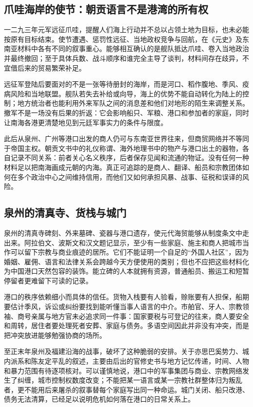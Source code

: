 \subsection{爪哇海岸的使节：朝贡语言不是港湾的所有权}

一二九三年元军远征爪哇，提醒人们海上行动并不总以占领土地为目标，也未必能按原有目标结束。使节遭遇、惩罚性远征、当地政权竞争与回航，在《元史》及东南亚材料中各有不同的叙事重心。能够相互确认的是舰队抵达爪哇、卷入当地政治并最终撤回；至于具体兵数、战斗顺序和谁完全主导了谈判，材料间存在歧异，不宜借后来的贸易繁荣补足。

远征军登陆后要面对的不是一张等待册封的海岸，而是河口、稻作腹地、季风、疫病风险和当地联盟。舰队若失去补给或向导，海上的优势不能自动转化为陆上的控制；地方统治者也能利用外来军队之间的消息差和他们对地形的陌生来调整关系。撤军不是一场没有后果的折返：它会影响船只、军粮、港口和参加者的家庭，同时让南海各港更清楚地见到元廷军事实力的条件与限度。

此后从泉州、广州等港口出发的商人仍可与东南亚世界往来，但商贸网络并不等同于帝国主权。朝贡文书中的礼仪称谓、海外地理书中的物产与港口出土的器物，各自记录不同关系：前者关心名义秩序，后者保存见闻和流通的物证。没有任何一种材料足以把南海画成元朝的内海。真正可追踪的是商人、翻译、船员和宗教团体如何在多个政治中心之间维持信用，而他们又如何承担风暴、战事、征税和误译的风险。

\subsection{泉州的清真寺、货栈与城门}

泉州的清真寺碑刻、外来墓碑、瓷器与港口遗存，使元代海贸能够从制度条文中走出来。阿拉伯文、波斯文和汉文题记显示，至少有一些家庭、施主和商人把城市当作可以留下宗教与商业痕迹的居所。它们不能证明一个自足的“外国人社区”，因为婚姻、雇佣、语言和法律关系会跨越今天方便使用的类别；但也不应把这些材料化为中国港口天然包容的装饰。能立碑的人本就拥有资源，普通船员、搬运工和短暂停留者更难留下可读的记录。

港口的秩序依赖细小而具体的信任。货物入栈要有人验看，赊账要有人担保，船期要估计季风，诉讼或纠纷要找到能听懂当事人语言的中介。市舶官、牙人、宗教领袖、商号亲属与地方官未必追求同一件事：国家要税与可登记的往来，商人要安全和周转，居住者要处理死者安葬、家庭与债务。多语空间因此并非没有冲突，而是把冲突放进能够勉强协商的场所。

至正末年泉州及福建沿海的战事，破坏了这种脆弱的安排。关于亦思巴奚势力、城内派系和陈友定平乱的叙述，主要由后出的官修史书与地方记忆传递，时间、人物和暴力范围有待逐项核对。可以谨慎地说，港口中的军事集团与商业、宗教网络发生了纠缠，城市控制权数度改变；不能把某一语言或某一宗教社群整体归为叛乱者，更不能用后来屠杀的叙事替每个家庭写出同一种命运。城门关闭、船只改港、债务无法清算，已经足以说明危机如何落在港口的日常关系上。

